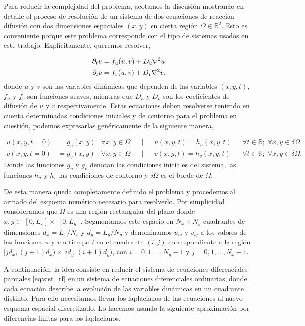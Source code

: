 Para reducir la complejidad del problema, acotamos la discusión mostrando en detalle el proceso de resolución de un sistema de 
dos ecuaciones de reacción-difusión con dos dimensiones espaciales $(x,y)$ en cierta región $\Omega \in \mathbb{R}^2$. Esto es conveniente porque 
este problema corresponde con el tipo de sistemas usados en este trabajo. Explícitamente, queremos resolver,

\begin{equation}
\begin{split}
 \partial_t u & = f_u(u,v) + D_u \laplacian{u}\\
 \partial_t v & = f_v(u,v) + D_v \laplacian{v}, 
\label{eq:sist_rf}
\end{split}
\end{equation}
donde $u$ y $v$ son las variables dinámicas que dependen de las variables $(x,y,t)$, $f_u$ y $f_v$ son funciones suaves, mientras que $D_u$ y $D_v$ 
son los coeficientes de difusión de $u$ y $v$ respectivamente. Estas ecuaciones deben resolverse teniendo en cuenta determinadas condiciones iniciales y 
de contorno para el problema en cuestión, podemos expresarlas genéricamente de la siguiente manera,

\begin{align*}
u(x,y,t = 0) & = g_u(x,y) & \forall x,y \in \Omega &&|&& u(x,y,t) = h_u(x,y,t) && \forall t\in \mathbb{R};\; \forall x,y \in \delta \Omega\\
v(x,y,t = 0) & = g_v(x,y) & \forall x,y \in \Omega &&|&& v(x,y,t) = h_v(x,y,t) && \forall t\in \mathbb{R};\; \forall x,y \in \delta \Omega.
\label{eq:ic}
\end{align*}
Donde las funciones $g_u$ y $g_v$ denotan las condiciones iniciales del sistema, las funciones $h_u$ y $h_v$ las 
condiciones de contorno y $\delta \Omega$ es el borde de $\Omega$.

De esta manera queda completamente definido el problema y procedemos al armado del esquema numérico necesario para resolverlo. Por simplicidad consideramos que 
$\Omega$ es una región rectangular del plano donde $x,y \in ~ [0,L_x] \times ~[0,L_y]$. Segmentamos este espacio en $N_x \times N_y$ cuadrantes de dimensiones $d_x = L_x/N_x$ y 
$d_y=L_y/N_y$ y denominamos $u_{ij}$ y $v_{ij}$ a los valores de las funciones $u$ y $v$ a tiempo $t$ en el cuadrante $(i,j)$ correspondiente a la región 
$[jd_x,(j+1)d_x) \times [id_y,(i+1)d_y)$, con $i =0,1,...,N_y-1$ y $j = 0,1,...,N_x-1$.

A continuación, la idea consiste en reducir el sistema de ecuaciones diferenciales parciales \ref{eq:sist_rf} en un sistema de ecuaciones diferenciales ordinarias, donde 
cada ecuación describe la evolución de las variables dinámicas en un cuadrante distinto. Para ello necesitamos llevar los laplacianos de las ecuaciones al nuevo esquema 
espacial discretizado. Lo hacemos usando la siguiente aproximación por diferencias finitas para los laplacianos,


